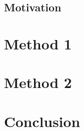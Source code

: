 \documentclass[10pt]{article}
\begin{document}
\subsection{Motivation}
\section{Method 1}
\section{Method 2}
\section{Conclusion}



\end{document}
